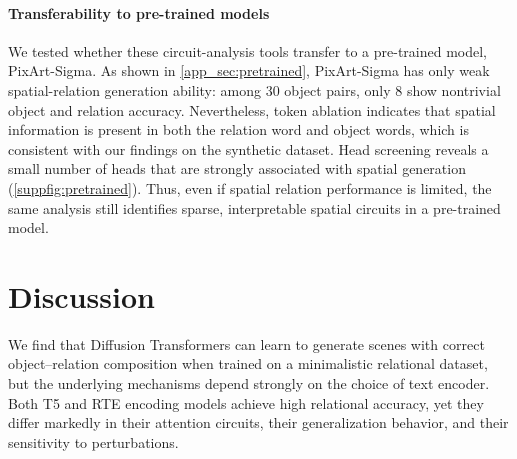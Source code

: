 \documentclass[10pt,twocolumn,letterpaper]{article}
\begin{document}



\paragraph{Transferability to pre-trained models} 

We tested whether these circuit-analysis tools transfer to a pre-trained model, PixArt-Sigma. As shown in \ref{app_sec:pretrained}, PixArt-Sigma has only weak spatial-relation generation ability: among 30 object pairs, only 8 show nontrivial object and relation accuracy. Nevertheless, token ablation indicates that spatial information is present in both the relation word and object words, which is consistent with our findings on the synthetic dataset. Head screening reveals a small number of heads that are strongly associated with spatial generation (\cref{suppfig:pretrained}). Thus, even if spatial relation performance is limited, the same analysis still identifies sparse, interpretable spatial circuits in a pre-trained model. 


\section{Discussion}

We find that Diffusion Transformers can learn to generate scenes with correct object–relation composition when trained on a minimalistic relational dataset, but the underlying mechanisms depend strongly on the choice of text encoder. Both T5 and RTE encoding models achieve high relational accuracy, yet they differ markedly in their attention circuits, their generalization behavior, and their sensitivity to perturbations. 
\end{document}
